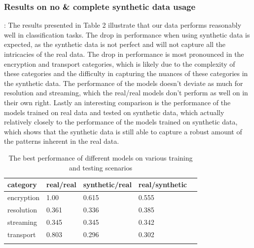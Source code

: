 \documentclass[sigconf, nonacm]{acmart}
\begin{document}
\subsubsection{Results on no \& complete synthetic data usage}: The results presented
in Table 2 illustrate that our data performs reasonably well in classification tasks. 
The drop in performance when using synthetic data is expected, as the synthetic data
is not perfect and will not capture all the intricacies of the real data. The drop
in performance is most pronounced in the encryption and transport categories, which
is likely due to the complexity of these categories and the difficulty in capturing
the nuances of these categories in the synthetic data. The performance of the models
doesn't deviate as much for resolution and streaming, which the real/real models don't
perform as well on in their own right. Lastly an interesting comparison is the
performance of the models trained on real data and tested on synthetic data, which
actually relatively closely to the performance of the models trained on synthetic data,
which shows that the synthetic data is still able to capture a robust amount of 
the patterns inherent in the real data.


\begin{table}[h!]
\centering
\begin{tabular}{lllll}
\toprule
\textbf{category} & \textbf{real/real} & \textbf{synthetic/real} & \textbf{real/synthetic} \\ \midrule
encryption   & 1.00 & 0.615 & 0.555 \\
resolution & 0.361 & 0.336 & 0.385 \\
streaming & 0.345 & 0.345 & 0.342 \\
transport & 0.803 & 0.296 & 0.302 \\
\bottomrule \\
\end{tabular}
\caption{The best performance of different models on various training and testing scenarios}
\end{table}
\end{document}
